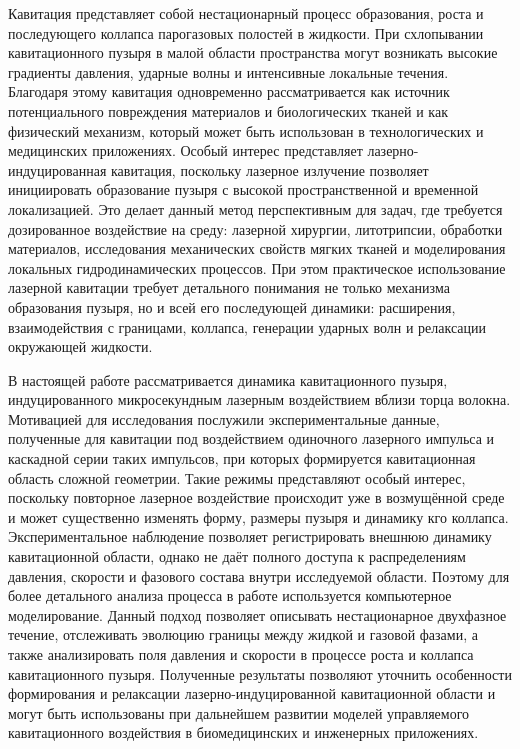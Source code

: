 Кавитация представляет собой нестационарный процесс образования, роста и последующего коллапса парогазовых полостей в жидкости. 
При схлопывании кавитационного пузыря в малой области пространства могут возникать высокие градиенты давления, ударные волны и интенсивные локальные течения. 
Благодаря этому кавитация одновременно рассматривается как источник потенциального повреждения материалов и биологических тканей и как физический механизм, который может быть использован в технологических и медицинских приложениях. 
Особый интерес представляет лазерно-индуцированная кавитация, поскольку лазерное излучение позволяет инициировать образование пузыря с высокой пространственной и временной локализацией. 
Это делает данный метод перспективным для задач, где требуется дозированное воздействие на среду: лазерной хирургии, литотрипсии, обработки материалов, исследования механических свойств мягких тканей и моделирования локальных гидродинамических процессов. 
При этом практическое использование лазерной кавитации требует детального понимания не только механизма образования пузыря, но и всей его последующей динамики: расширения, взаимодействия с границами, коллапса, генерации ударных волн и релаксации окружающей жидкости.

В настоящей работе рассматривается динамика кавитационного пузыря, индуцированного микросекундным лазерным воздействием вблизи торца волокна. 
Мотивацией для исследования послужили экспериментальные данные, полученные для кавитации под воздействием одиночного лазерного импульса и каскадной серии таких импульсов, при которых формируется кавитационная область сложной геометрии. 
Такие режимы представляют особый интерес, поскольку повторное лазерное воздействие происходит уже в возмущённой среде и может существенно изменять форму, размеры пузыря и динамику кго коллапса. 
Экспериментальное наблюдение позволяет регистрировать внешнюю динамику кавитационной области, однако не даёт полного доступа к распределениям давления, скорости и фазового состава внутри исследуемой области. 
Поэтому для более детального анализа процесса в работе используется компьютерное моделирование. 
Данный подход позволяет описывать нестационарное двухфазное течение, отслеживать эволюцию границы между жидкой и газовой фазами, а также анализировать поля давления и скорости в процессе роста и коллапса кавитационного пузыря. 
Полученные результаты позволяют уточнить особенности формирования и релаксации лазерно-индуцированной кавитационной области и могут быть использованы при дальнейшем развитии моделей управляемого кавитационного воздействия в биомедицинских и инженерных приложениях.
